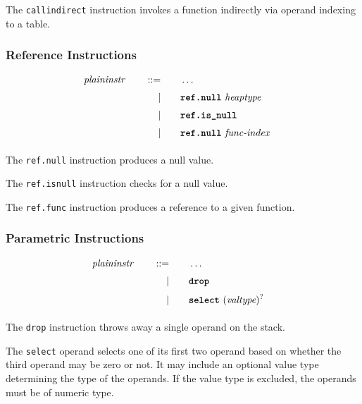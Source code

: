 The \texttt{call\textunderscore indirect} instruction invokes a function indirectly via operand indexing to a table.

\subsubsection{Reference Instructions}

\begin{alignat*}{9}
    && \textit{plaininstr}\ &&\quad ::= &\quad && \dots \quad &&  \\[1mm]
    &&       &&\quad | &\quad && \textbf{\texttt{ref.null}}\ \textit{heaptype}\ \quad && \\[1mm]
    &&       &&\quad | &\quad && \textbf{\texttt{ref.is\textunderscore null}}\ \quad && \\[1mm]
    &&       &&\quad | &\quad && \textbf{\texttt{ref.null}}\ \textit{func-index}\ \quad && \\[1mm]
\end{alignat*}

The \texttt{ref.null} instruction produces a null value. \vspace {1em}

The \texttt{ref.is\textunderscore null} instruction checks for a null value. \vspace {1em}

The \texttt{ref.func} instruction produces a reference to a given function. \vspace {1em}

\subsubsection{Parametric Instructions}
\begin{alignat*}{9}
    && \textit{plaininstr}\ &&\quad ::= &\quad && \dots \quad &&  \\[1mm]
    &&       &&\quad | &\quad && \textbf{\texttt{drop}} \quad && \\[1mm]
    &&       &&\quad | &\quad && \textbf{\texttt{select}}\ (\textit{valtype})^? \quad && \\[1mm]
\end{alignat*}

The \texttt{drop} instruction throws away a single operand on the stack. \vspace{1em}

The \texttt{select} operand selects one of its first two operand based on whether the third operand may be zero or not.
It may include an optional value type determining the type of the operands. If the value type is excluded, the operands must be of numeric type. \vspace{1em}

